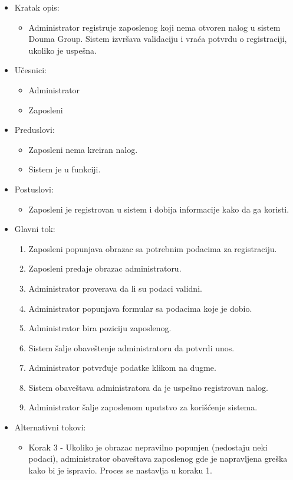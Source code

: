 \documentclass[a4paper]{article}
\begin{document}
\begin{itemize}
    \item Kratak opis: 
    \begin{itemize}
        \item Administrator registruje zaposlenog koji nema otvoren nalog u sistem Douma Group. Sistem izvršava validaciju i vraća potvrdu o registraciji, ukoliko je uspešna.
    \end{itemize}
    \item Učesnici:
        \begin{itemize}
        \item Administrator
        \item Zaposleni
    \end{itemize}
    \item Preduslovi:
        \begin{itemize}
            \item Zaposleni nema kreiran nalog.
            \item Sistem je u funkciji.
        \end{itemize}
    \item Postuslovi:
        \begin{itemize}
            \item Zaposleni je registrovan u sistem i dobija informacije kako da ga koristi.
        \end{itemize}
    \item Glavni tok:
        \begin{enumerate}
            \item Zaposleni popunjava obrazac sa potrebnim podacima za registraciju.
            \item Zaposleni predaje obrazac administratoru.
            \item Administrator proverava da li su podaci validni.
            \item Administrator popunjava formular sa podacima koje je dobio.
            \item Administrator bira poziciju zaposlenog.
            \item Sistem šalje obaveštenje administratoru da potvrdi unos.
            \item Administrator potvrđuje podatke klikom na dugme.
            \item Sistem obaveštava administratora da je uspešno registrovan nalog.
            \item Administrator šalje zaposlenom uputstvo za korišćenje sistema.
        \end{enumerate}
    \item Alternativni tokovi:
        \begin{itemize}
            \item Korak 3 - Ukoliko je obrazac nepravilno popunjen (nedostaju neki podaci), administrator obaveštava zaposlenog gde je napravljena greška kako bi je ispravio. Proces se nastavlja u koraku 1.
        \end{itemize}
\end{itemize}
\end{document}
